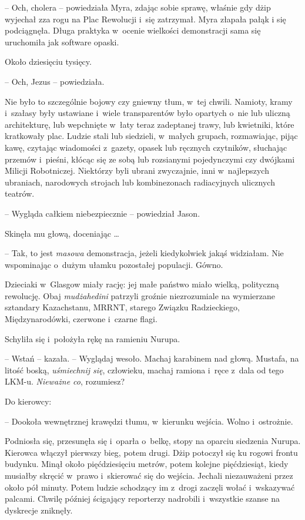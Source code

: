 \documentclass[oneside,polish,11pt,sfheadings]{mwbk}
\begin{document}
-- Och, cholera -- powiedziała Myra, zdając sobie sprawę, właśnie gdy dżip
wyjechał zza rogu na Plac Rewolucji i~się zatrzymał. Myra złapała pałąk
i się podciągnęła. Długa praktyka w~ocenie wielkości demonstracji sama
się uruchomiła jak software opaski.

Około dziesięciu tysięcy.

-- Och, Jezus -- powiedziała.

Nie było to szczególnie bojowy czy gniewny tłum, w~tej chwili. Namioty,
kramy i~szałasy były ustawiane i~wiele transparentów było opartych o~nie
lub uliczną architekturę, lub wepchnięte w~łaty teraz zadeptanej trawy,
lub kwietniki, które kratkowały plac. Ludzie stali lub siedzieli, w~małych grupach, rozmawiając, pijąc kawę, czytając wiadomości z~gazety,
opasek lub ręcznych czytników, słuchając przemów i~pieśni, kłócąc się ze
sobą lub rozsianymi pojedynczymi czy dwójkami Milicji Robotniczej.
Niektórzy byli ubrani zwyczajnie, inni w~najlepszych ubraniach,
narodowych strojach lub kombinezonach radiacyjnych ulicznych teatrów.

-- Wygląda całkiem niebezpiecznie -- powiedział Jason.

Skinęła mu głową, doceniając \ldots 

-- Tak, to jest \textit{masowa
}demonstracja, jeżeli kiedykolwiek jakąś widziałam. Nie wspominając o~dużym ułamku pozostałej populacji. Gówno.

Dzieciaki w~Glasgow miały rację: jej małe państwo miało wielką,
polityczną rewolucję. Obaj \textit{mudżahedini }patrzyli groźnie
niezrozumiale na wymierzane sztandary Kazachstanu, MRRNT, starego
Związku Radzieckiego, Międzynarodówki, czerwone i~czarne flagi.

Schyliła się i~położyła rękę na ramieniu Nurupa.

-- Wstań -- kazała. -- Wyglądaj wesoło. Machaj karabinem nad głową.
Mustafa, na litość boską, \textit{uśmiechnij się}, człowieku, machaj
ramiona i~ręce z~dala od tego LKM-u. \textit{Nieważne co}, rozumiesz?

Do kierowcy: 

-- Dookoła wewnętrznej krawędzi tłumu, w~kierunku wejścia.
Wolno i~ostrożnie.

Podniosła się, przesunęła się i~oparła o~belkę, stopy na oparciu
siedzenia Nurupa. Kierowca włączył pierwszy bieg, potem drugi. Dżip
potoczył się ku rogowi frontu budynku. Minął około pięćdziesięciu
metrów, potem kolejne pięćdziesiąt, kiedy musiałby skręcić w~prawo i~skierować się do wejścia. Jechali niezauważeni przez około pół minuty.
Potem ludzie schodzący im z~drogi zaczęli wołać i~wskazywać palcami.
Chwilę później ścigający reporterzy nadrobili i~wszystkie szanse na
dyskrecje zniknęły.
\end{document}
